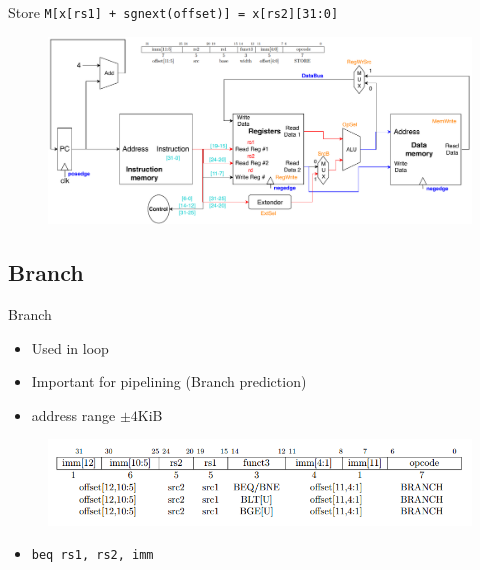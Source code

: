 \documentclass[UTF8]{ctexbeamer}
\begin{document}
\begin{frame}[fragile]{Store}
\verb'M[x[rs1] + sgnext(offset)] = x[rs2][31:0]'
\begin{figure}
\centering
\includegraphics[width=\linewidth]{fig/Lecture2/Datapath-sw.pdf}
\end{figure}
\end{frame}

\subsection{Branch}
\begin{frame}
\subsectionpage
\end{frame}

\begin{frame}[fragile]{Branch}
\begin{itemize}
	\item Used in loop
	\item Important for pipelining (Branch prediction)
	\item address range $\pm 4$KiB
\end{itemize}
\begin{figure}
\centering
\includegraphics[width=\linewidth]{fig/Lecture2/branch.PNG}
\end{figure}
\begin{itemize}
	\item \verb'beq rs1, rs2, imm'
\end{itemize}
\end{frame}
\end{document}
